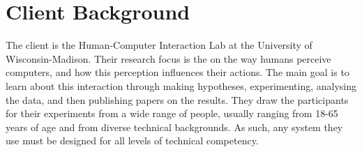 \section{Client Background}
The client is the Human-Computer Interaction Lab at the University of Wisconsin-Madison. Their research focus is the on the way humans perceive computers, and how this perception influences their actions. The main goal is to learn about this interaction through making hypotheses, experimenting, analysing the data, and then publishing papers on the results.  They draw the participants for their experiments from a wide range of people, usually ranging from 18-65 years of age and from diverse technical backgrounds.  As such, any system they use must be designed for all levels of technical competency.